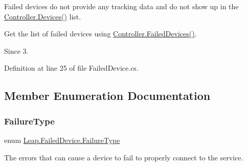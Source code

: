 Failed devices do not provide any tracking data and do not show up in the \mbox{\hyperlink{class_leap_1_1_controller_aa5e641f54418e5194161ac45dc15c7fb}{Controller.\+Devices()}} list.

Get the list of failed devices using \mbox{\hyperlink{class_leap_1_1_controller_ab73815d54d49bf570371fe1ec39fe770}{Controller.\+Failed\+Devices()}}.

\begin{DoxySince}{Since}
3. 
\end{DoxySince}


Definition at line 25 of file Failed\+Device.\+cs.



\subsection{Member Enumeration Documentation}
\mbox{\label{class_leap_1_1_failed_device_a2737c8ecbc644f3d14200183fe08c3a9}} 
\subsubsection{\texorpdfstring{FailureType}{FailureType}}
{\footnotesize\ttfamily enum \mbox{\hyperlink{class_leap_1_1_failed_device_a2737c8ecbc644f3d14200183fe08c3a9}{Leap.\+Failed\+Device.\+Failure\+Type}}\hspace{0.3cm}{\ttfamily [strong]}}



The errors that can cause a device to fail to properly connect to the service. 

